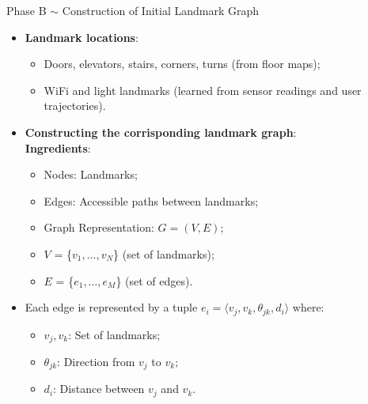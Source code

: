 \begin{frame}{Phase B $\sim$ Construction of Initial Landmark Graph}
    \begin{itemize}
        \item \textbf{Landmark locations}:
            \begin{itemize}
                \item Doors, elevators, stairs, corners, turns (from floor maps);\item WiFi and light landmarks (learned from sensor readings and user trajectories).
            \end{itemize}
        \item \textbf{Constructing the corrisponding landmark graph}:\\
            \textbf{Ingredients}:
            \begin{itemize}
                \item Nodes: Landmarks;
                \item Edges: Accessible paths between landmarks;
                \item Graph Representation: $G = (V, E)$;
                \item $V$ = \{$v_1, \dots, v_N$\} (set of landmarks);
                \item $E$ = \{$e_1, \dots, e_M$\} (set of edges).
            \end{itemize}
        \item Each edge is represented by a tuple $e_i = \langle v_j, v_k, \theta_{jk}, d_i \rangle$ where:
            \begin{itemize}
                \item $v_j, v_k$: Set of landmarks;
                \item $\theta_{jk}$: Direction from $v_j$ to $v_k$;
                \item $d_i$: Distance between $v_j$ and $v_k$.
            \end{itemize}
    \end{itemize}
\end{frame}

